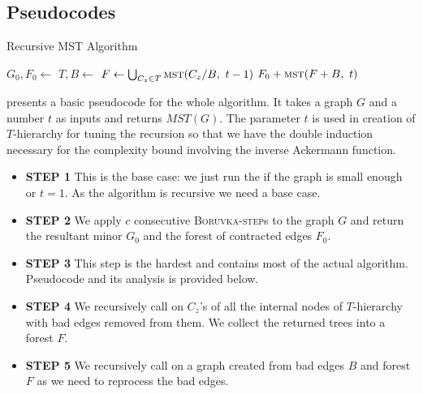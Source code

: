 \subsection{Pseudocodes}
\begin{algorithm}
\caption{Recursive MST Algorithm}
\begin{algorithmic}[1]
        \State \Return {} 
    \EndIf
    \State $G_0, F_0 \gets$  
    \State $T, B \gets$  
    \State $F \gets \bigcup_{C_z \in T} \textsc{mst}(C_z / B, \ t-1)$ 
    \State \Return $F_0 + \Call{mst}{F + B, \ t}$ 
\EndFunction
\end{algorithmic}
\label{cmst}
\end{algorithm}

 presents a basic pseudocode for the whole algorithm. It takes a graph $G$ and a number $t$ as inputs and returns $MST(G)$. The parameter $t$ is used in creation of $T$-hierarchy for tuning the recursion so that we have the double induction necessary for the complexity bound involving the inverse Ackermann function.
\begin{itemize}
    \item \textbf{STEP 1} This is the base case:  we just run the  if the graph is small enough or $t = 1$. As the algorithm is recursive we need a base case.
    \item \textbf{STEP 2} We apply $c$ consecutive \textsc{Boruvka-step}s to the graph $G$ and return the resultant minor $G_0$ and the forest of contracted edges $F_0$.
    \item \textbf{STEP 3} This step is the hardest and contains most of the actual algorithm. Pseudocode and its analysis is provided below.
    \item \textbf{STEP 4} We recursively call  on $C_z$'s of all the internal nodes of $T$-hierarchy with bad edges removed from them. We collect the returned trees into a forest $F$.
    \item \textbf{STEP 5} We recursively call  on a graph created from bad edges $B$ and forest $F$ as we need to reprocess the bad edges. 
\end{itemize}

